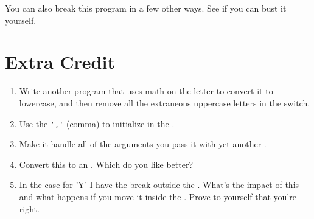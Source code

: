 You can also break this program in a few other ways.  See if you
can bust it yourself.

\section{Extra Credit}

\begin{enumerate}
\item Write another program that uses math on the letter to
    convert it to lowercase, and then remove all the extraneous
    uppercase letters in the switch.
\item Use the \verb|','| (comma) to initialize  
    in the .
\item Make it handle all of the arguments you pass it with 
    yet another .
\item Convert this  to an .
    Which do you like better?
\item In the case for 'Y' I have the break outside the . What's the impact of this
    and what happens if you move it inside the . Prove to yourself that you're right.
\end{enumerate}

